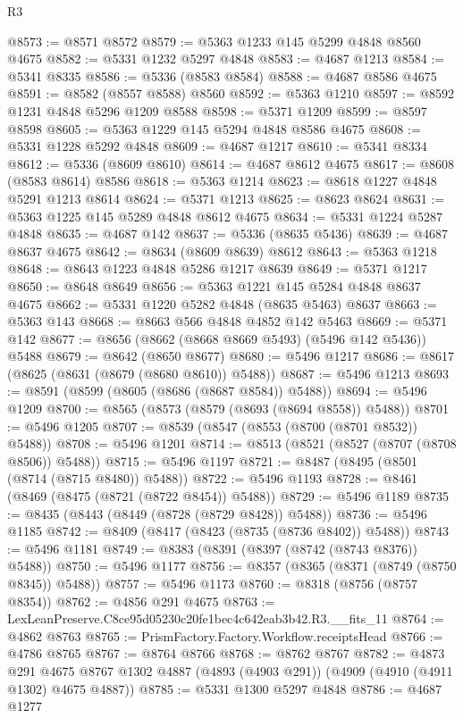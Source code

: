 \begin{lexlean}{R3}
\begin{coremodule}
@8573 := @8571 @8572
@8579 := @5363 @1233 @145 @5299 @4848 @8560 @4675
@8582 := @5331 @1232 @5297 @4848
@8583 := @4687 @1213
@8584 := @5341 @8335
@8586 := @5336 (@8583 @8584)
@8588 := @4687 @8586 @4675
@8591 := @8582 (@8557 @8588) @8560
@8592 := @5363 @1210
@8597 := @8592 @1231 @4848 @5296 @1209 @8588
@8598 := @5371 @1209
@8599 := @8597 @8598
@8605 := @5363 @1229 @145 @5294 @4848 @8586 @4675
@8608 := @5331 @1228 @5292 @4848
@8609 := @4687 @1217
@8610 := @5341 @8334
@8612 := @5336 (@8609 @8610)
@8614 := @4687 @8612 @4675
@8617 := @8608 (@8583 @8614) @8586
@8618 := @5363 @1214
@8623 := @8618 @1227 @4848 @5291 @1213 @8614
@8624 := @5371 @1213
@8625 := @8623 @8624
@8631 := @5363 @1225 @145 @5289 @4848 @8612 @4675
@8634 := @5331 @1224 @5287 @4848
@8635 := @4687 @142
@8637 := @5336 (@8635 @5436)
@8639 := @4687 @8637 @4675
@8642 := @8634 (@8609 @8639) @8612
@8643 := @5363 @1218
@8648 := @8643 @1223 @4848 @5286 @1217 @8639
@8649 := @5371 @1217
@8650 := @8648 @8649
@8656 := @5363 @1221 @145 @5284 @4848 @8637 @4675
@8662 := @5331 @1220 @5282 @4848 (@8635 @5463) @8637
@8663 := @5363 @143
@8668 := @8663 @566 @4848 @4852 @142 @5463
@8669 := @5371 @142
@8677 := @8656 (@8662 (@8668 @8669 @5493) (@5496 @142 @5436)) @5488
@8679 := @8642 (@8650 @8677)
@8680 := @5496 @1217
@8686 := @8617 (@8625 (@8631 (@8679 (@8680 @8610)) @5488))
@8687 := @5496 @1213
@8693 := @8591 (@8599 (@8605 (@8686 (@8687 @8584)) @5488))
@8694 := @5496 @1209
@8700 := @8565 (@8573 (@8579 (@8693 (@8694 @8558)) @5488))
@8701 := @5496 @1205
@8707 := @8539 (@8547 (@8553 (@8700 (@8701 @8532)) @5488))
@8708 := @5496 @1201
@8714 := @8513 (@8521 (@8527 (@8707 (@8708 @8506)) @5488))
@8715 := @5496 @1197
@8721 := @8487 (@8495 (@8501 (@8714 (@8715 @8480)) @5488))
@8722 := @5496 @1193
@8728 := @8461 (@8469 (@8475 (@8721 (@8722 @8454)) @5488))
@8729 := @5496 @1189
@8735 := @8435 (@8443 (@8449 (@8728 (@8729 @8428)) @5488))
@8736 := @5496 @1185
@8742 := @8409 (@8417 (@8423 (@8735 (@8736 @8402)) @5488))
@8743 := @5496 @1181
@8749 := @8383 (@8391 (@8397 (@8742 (@8743 @8376)) @5488))
@8750 := @5496 @1177
@8756 := @8357 (@8365 (@8371 (@8749 (@8750 @8345)) @5488))
@8757 := @5496 @1173
@8760 := @8318 (@8756 (@8757 @8354))
@8762 := @4856 @291 @4675
@8763 := LexLeanPreserve.C8ce95d05230c20fe1bec4c642eab3b42.R3.__fits_11
@8764 := @4862 @8763
@8765 := PrismFactory.Factory.Workflow.receiptsHead
@8766 := @4786 @8765
@8767 := @8764 @8766
@8768 := @8762 @8767
@8782 := @4873
    @291
    @4675
    @8767
    @1302
    @4887
    (@4893 (@4903 @291))
    (@4909 (@4910 (@4911 @1302) @4675 @4887))
@8785 := @5331 @1300 @5297 @4848
@8786 := @4687 @1277

\end{coremodule}
\end{lexlean}
